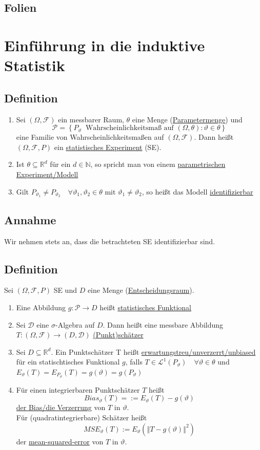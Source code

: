 \documentclass[german,10pt,oneside, fleqn, a4paper]{article}
\newcommand {\R}	{\mathbb{R}}
\newcommand {\N}	{\mathbb{N}}
\newcommand{\ra}{\rightarrow}
\newcommand{\brc}[1]{\left(#1\right)}
\newcommand{\brac}[1]{\left\lbrace #1\right\rbrace}
\newcommand{\norm}[1]{\left\Vert #1 \right\Vert}
\newcommand{\mc}[1]{\mathcal{#1}}
\newcommand{\lp}[1]{\mc{L}^{#1}}
\newcommand{\1}[1]{1_{#1}}
\newcommand{\2}[1]{\1{\brac{#1}}}
\newcommand{\raum}{\brc{\Omega,\mc{F},P}}
\newcommand{\f}{\mc{F}}
\newcommand{\p}{\mc{P}}
\newcommand{\qf}{\quad\forall}
\begin{document}
\subsection{Folien}
%



\section{Einführung in die induktive Statistik}
\subsection{Definition}
\label{9.1}
\begin{enumerate}[label=(\roman*)]
\item Sei $(\Omega,\f)$ ein messbarer Raum, $\theta$ eine Menge (\underline{Parametermenge}) und \[\p=\brac{P_\vartheta\ \text{ Wahrscheinlichkeitsmaß auf }(\Omega,\theta):\vartheta\in\theta}\]
eine Familie von Wahrscheinlichkeitsmaßen auf $(\Omega,\f)$. Dann heißt $\raum$ ein \underline{statistisches Experiment} (SE).
\item Ist $\theta\subseteq\R^d$ für ein $d\in\N$, so spricht man von einem \underline{parametrischen Experiment/Modell}
\item Gilt $P_{\vartheta_1}\neq P_{\vartheta_2}\qf \vartheta_1,\vartheta_2\in\theta$ mit $\vartheta_1\neq\vartheta_2$, so heißt das Modell \underline{identifizierbar}
\end{enumerate}

\subsection{Annahme}
\label{9.2}
Wir nehmen stets an, dass die betrachteten SE identifizierbar sind.

\subsection{Definition}
\label{9.3}
Sei $\raum$ SE und $D$ eine Menge (\underline{Entscheidungsraum}).\begin{enumerate}[label=(\alph*)]
\item Eine Abbildung $g:\p\ra D$ heißt \underline{statistisches Funktional}
\item Sei $\mc{D}$ eine $\sigma$-Algebra auf $D$. Dann heißt eine messbare Abbildung $T:(\Omega,\f)\ra(D,\mc{D})$ \underline{(Punkt)schätzer}
\item Sei $D\subseteq\R^d$. Ein Punktschätzer T heißt \underline{erwartungstreu/unverzerrt/unbiased} für ein statischtisches Funktional $g$, falls $T\in\lp{1}(P_\vartheta)\qf \vartheta\in\theta$ und $E_\vartheta(T)=E_{P_\vartheta}(T)=g(\vartheta)=g(P_\vartheta)$
\item Für einen integrierbaren Punktschätzer $T$ heißt \[
Bias_\vartheta(T)=:=E_\vartheta(T)-g(\vartheta)\]
\underline{der Bias/die Verzerrung} von $T$ in $\vartheta$.\\
Für (quadratintegrierbare) Schätzer heißt \[
MSE_\vartheta(T):=E_\vartheta(\norm{T-g(\vartheta)}^2)\]
der \underline{mean-squared-error} von $T$ in $\vartheta$.
\end{enumerate}
\end{document}
